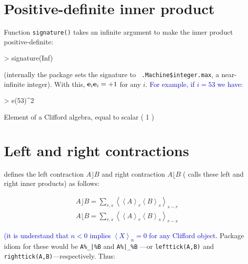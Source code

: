 \documentclass{birkjour}
\theoremstyle{definition}
\theoremstyle{remark}
\numberwithin{equation}{section}
\begin{document}
\section{Positive-definite inner product}

Function {\tt signature()} takes an infinite argument to make the
inner product positive-definite:

\begin{Schunk}
\begin{Sinput}
> signature(Inf)
\end{Sinput}
\end{Schunk}

(internally the package sets the signature to {\tt
  .Machine\$integer.max}, a near-infinite integer).  With this,
${\bf e}_{i}{\bf e}_{i}=+1$ for any $i$.  \textcolor{blue}{For example, if
  $i=53$ we have:}

\begin{Schunk}
\begin{Sinput}
> e(53)^2
\end{Sinput}
\begin{Soutput}
Element of a Clifford algebra, equal to
scalar ( 1 )
\end{Soutput}
\end{Schunk}


\section{Left and right contractions}

\cite{dorst2002} defines the left contraction $A\rfloor B$ and right
contraction $A\lfloor B$ (\cite{chisholm2012} calls these left and
right inner products) as follows:

\begin{eqnarray}
\displaystyle A\rfloor B = \sum_{r,s}\left\langle\left\langle
A\right\rangle_r\left\langle B\right\rangle_s\right\rangle_{s-r}\\
\displaystyle A\lfloor B = \sum_{r,s}\left\langle\left\langle
A\right\rangle_r\left\langle B\right\rangle_s\right\rangle_{r-s}
\end{eqnarray}

\textcolor{blue}{(it is understand that $n<0$ implies $\left\langle
  X\right\rangle_n=0$ for any Clifford object.}
Package idiom for these would be {\tt A\%\_|\%B} and {\tt A\%|\_\%B}
---or {\tt lefttick(A,B)} and {\tt righttick(A,B)}---respectively.
Thus:
\end{document}
